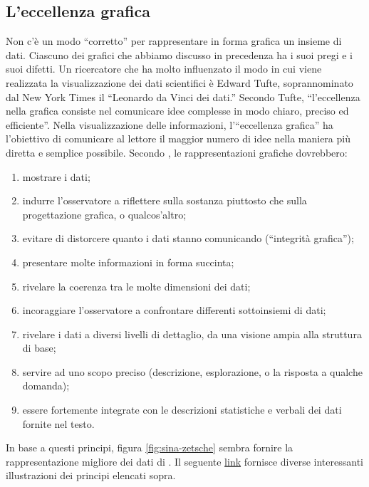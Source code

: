 \documentclass[
  10pt,
  italian,
  a4paper,
  extrafontsizes,onecolumn,openright
  ]{memoir}
\providecommand{\tightlist}{%
  \setlength{\itemsep}{0pt}\setlength{\parskip}{0pt}}
\theoremstyle{definition}
\theoremstyle{definition}
\theoremstyle{definition}
\theoremstyle{definition}
\theoremstyle{remark}
\begin{document}
\hypertarget{leccellenza-grafica}{%
\subsection{L'eccellenza grafica}\label{leccellenza-grafica}}

Non c'è un modo ``corretto'' per rappresentare in forma grafica un insieme
di dati. Ciascuno dei grafici che abbiamo discusso in precedenza ha i suoi pregi e i suoi difetti. Un ricercatore che ha molto influenzato il modo in cui
viene realizzata la visualizzazione dei dati scientifici è Edward Tufte,
soprannominato dal New York Times il ``Leonardo da Vinci dei dati.''
Secondo Tufte, ``l'eccellenza nella grafica consiste nel comunicare idee
complesse in modo chiaro, preciso ed efficiente''. Nella visualizzazione
delle informazioni, l'``eccellenza grafica'' ha l'obiettivo di comunicare
al lettore il maggior numero di idee nella maniera più diretta e semplice possibile. Secondo \textcite{tufte_visual_display}, le rappresentazioni grafiche dovrebbero:

\begin{enumerate}
\def\labelenumi{\arabic{enumi}.}
\tightlist
\item
  mostrare i dati;
\item
  indurre l'osservatore a riflettere sulla sostanza piuttosto che
  sulla progettazione grafica, o qualcos'altro;
\item
  evitare di distorcere quanto i dati stanno comunicando (``integrità
  grafica'');
\item
  presentare molte informazioni in forma succinta;
\item
  rivelare la coerenza tra le molte dimensioni dei dati;
\item
  incoraggiare l'osservatore a confrontare differenti sottoinsiemi di dati;
\item
  rivelare i dati a diversi livelli di dettaglio, da una visione ampia
  alla struttura di base;
\item
  servire ad uno scopo preciso (descrizione, esplorazione, o la
  risposta a qualche domanda);
\item
  essere fortemente integrate con le descrizioni statistiche e verbali
  dei dati fornite nel testo.
\end{enumerate}

In base a questi principi, figura \ref{fig:sina-zetsche} sembra fornire la
rappresentazione migliore dei dati di \textcite{zetschefuture2019}. Il seguente \href{https://www.biostat.wisc.edu/~kbroman/presentations/graphs2018.pdf}{link} fornisce diverse interessanti illustrazioni dei principi elencati sopra.
\end{document}
